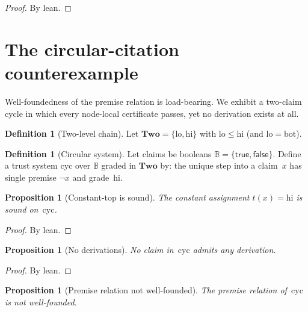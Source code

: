 \documentclass[11pt,a4paper]{article}
\theoremstyle{plain}
\newtheorem{proposition}[theorem]{Proposition}
\theoremstyle{definition}
\newtheorem{definition}[theorem]{Definition}
\newcommand{\bott}{\mathrm{bot}}
\begin{document}
\begin{proof}
By lean.
\end{proof}

\section{The circular-citation counterexample}

Well-foundedness of the premise relation is load-bearing. We exhibit a
two-claim cycle in which every node-local certificate passes, yet no
derivation exists at all.

\begin{definition}[Two-level chain]\label{def:two}
Let $\mathbf{Two} = \{\mathrm{lo}, \mathrm{hi}\}$ with
$\mathrm{lo} \le \mathrm{hi}$ (and $\mathrm{lo} = \bott$).
\end{definition}

\begin{definition}[Circular system]\label{def:cyc}
Let claims be booleans $\mathbb{B} = \{\mathsf{true}, \mathsf{false}\}$.
Define a trust system $\mathrm{cyc}$ over $\mathbb{B}$ graded in
$\mathbf{Two}$ by: the unique step into a claim~$x$ has single premise
$\neg x$ and grade~$\mathrm{hi}$.
\end{definition}

\begin{proposition}[Constant-top is sound]\label{prop:cyc-sound}
The constant assignment $t(x) = \mathrm{hi}$ is sound on~$\mathrm{cyc}$.
\end{proposition}

\begin{proof}
By lean.
\end{proof}

\begin{proposition}[No derivations]\label{prop:cyc-no-deriv}
No claim in~$\mathrm{cyc}$ admits any derivation.
\end{proposition}

\begin{proof}
By lean.
\end{proof}

\begin{proposition}[Premise relation not well-founded]\label{prop:cyc-not-wf}
The premise relation of~$\mathrm{cyc}$ is not well-founded.
\end{proposition}
\end{document}
